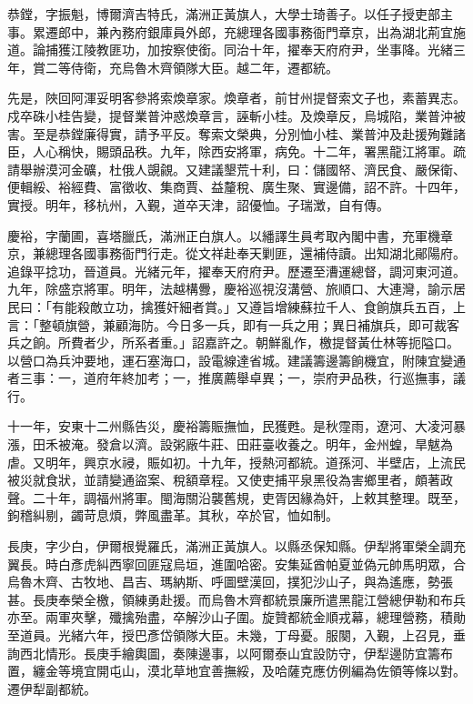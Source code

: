 \begin{pinyinscope}
恭鏜，字振魁，博爾濟吉特氏，滿洲正黃旗人，大學士琦善子。以任子授吏部主事。累遷郎中，兼內務府銀庫員外郎，充總理各國事務衙門章京，出為湖北荊宜施道。論捕獲江陵教匪功，加按察使銜。同治十年，擢奉天府府尹，坐事降。光緒三年，賞二等侍衛，充烏魯木齊領隊大臣。越二年，遷都統。

先是，陜回阿渾妥明客參將索煥章家。煥章者，前甘州提督索文子也，素蓄異志。戍卒硃小桂告變，提督業普沖惑煥章言，誣斬小桂。及煥章反，烏城陷，業普沖被害。至是恭鏜廉得實，請予平反。奪索文榮典，分別恤小桂、業普沖及赴援殉難諸臣，人心稱快，賜頭品秩。九年，除西安將軍，病免。十二年，署黑龍江將軍。疏請舉辦漠河金礦，杜俄人覬覦。又建議墾荒十利，曰：儲國帑、濟民食、嚴保衛、便輯綏、裕經費、富徵收、集商賈、益釐稅、廣生聚、實邊備，詔不許。十四年，實授。明年，移杭州，入覲，道卒天津，詔優恤。子瑞澂，自有傳。

慶裕，字蘭圃，喜塔臘氏，滿洲正白旗人。以繙譯生員考取內閣中書，充軍機章京，兼總理各國事務衙門行走。從文祥赴奉天剿匪，還補侍讀。出知湖北鄖陽府。追錄平捻功，晉道員。光緒元年，擢奉天府府尹。歷遷至漕運總督，調河東河道。九年，除盛京將軍。明年，法越構釁，慶裕巡視沒溝營、旅順口、大連灣，諭示居民曰：「有能殺敵立功，擒獲奸細者賞。」又遵旨增練蘇拉千人、食餉旗兵五百，上言：「整頓旗營，兼顧海防。今日多一兵，即有一兵之用；異日補旗兵，即可裁客兵之餉。所費者少，所系者重。」詔嘉許之。朝鮮亂作，檄提督黃仕林等扼隘口。以營口為兵沖要地，運石塞海口，設電線達省城。建議籌邊籌餉機宜，附陳宜變通者三事：一，道府年終加考；一，推廣薦舉卓異；一，崇府尹品秩，行巡撫事，議行。

十一年，安東十二州縣告災，慶裕籌賑撫恤，民獲甦。是秋霪雨，遼河、大凌河暴漲，田禾被淹。發倉以濟。設粥廠牛莊、田莊臺收養之。明年，金州蝗，旱魃為虐。又明年，興京水祲，賑如初。十九年，授熱河都統。道孫河、半壁店，上流民被災就食狀，並請變通盜案、稅額章程。又使吏捕平泉黑役為害鄉里者，頗著政聲。二十年，調福州將軍。閩海關沿襲舊規，吏胥因緣為奸，上敕其整理。既至，鉤稽糾剔，蠲苛息煩，弊風盡革。其秋，卒於官，恤如制。

長庚，字少白，伊爾根覺羅氏，滿洲正黃旗人。以縣丞保知縣。伊犁將軍榮全調充翼長。時白彥虎糾西寧回匪寇烏垣，進圍哈密。安集延酋帕夏並偽元帥馬明眾，合烏魯木齊、古牧地、昌吉、瑪納斯、呼圖壁漢回，撲犯沙山子，與為遙應，勢張甚。長庚奉榮全檄，領練勇赴援。而烏魯木齊都統景廉所遣黑龍江營總伊勒和布兵亦至。兩軍夾擊，殲擒殆盡，卒解沙山子圍。旋贊都統金順戎幕，總理營務，積勛至道員。光緒六年，授巴彥岱領隊大臣。未幾，丁母憂。服闋，入覲，上召見，垂詢西北情形。長庚手繪輿圖，奏陳邊事，以阿爾泰山宜設防守，伊犁邊防宜籌布置，纏金等境宜開屯山，漠北草地宜善撫綏，及哈薩克應仿例編為佐領等條以對。遷伊犁副都統。


\end{pinyinscope}
